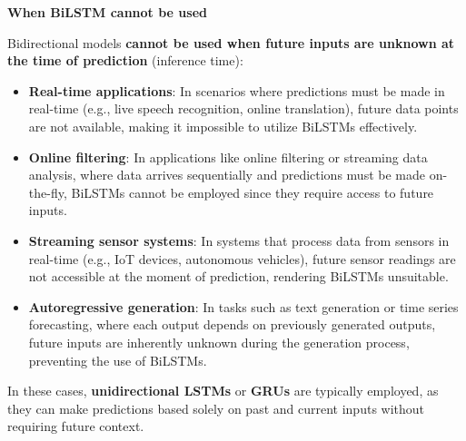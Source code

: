 \begin{flushleft}
    \textcolor{Red2}{ \textbf{When BiLSTM cannot be used}}
\end{flushleft}
Bidirectional models \textbf{cannot be used when future inputs are unknown at the time of prediction} (inference time):
\begin{itemize}
    \item \textbf{Real-time applications}: In scenarios where predictions must be made in real-time (e.g., live speech recognition, online translation), future data points are not available, making it impossible to utilize BiLSTMs effectively.
    \item \textbf{Online filtering}: In applications like online filtering or streaming data analysis, where data arrives sequentially and predictions must be made on-the-fly, BiLSTMs cannot be employed since they require access to future inputs.
    \item \textbf{Streaming sensor systems}: In systems that process data from sensors in real-time (e.g., IoT devices, autonomous vehicles), future sensor readings are not accessible at the moment of prediction, rendering BiLSTMs unsuitable.
    \item \textbf{Autoregressive generation}: In tasks such as text generation or time series forecasting, where each output depends on previously generated outputs, future inputs are inherently unknown during the generation process, preventing the use of BiLSTMs.
\end{itemize}
In these cases, \textbf{unidirectional LSTMs} or \textbf{GRUs} are typically employed, as they can make predictions based solely on past and current inputs without requiring future context.

